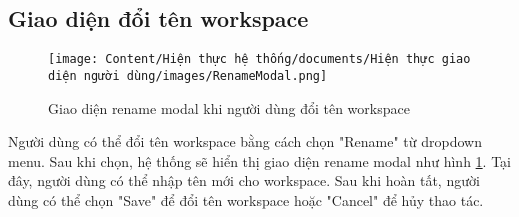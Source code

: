 \subsection{Giao diện đổi tên workspace}

\begin{figure}[H]
    \centering
    \texttt{[image: Content/Hiện thực hệ thống/documents/Hiện thực giao diện người dùng/images/RenameModal.png]}
    \vspace{0.5cm}
    \caption{Giao diện rename modal khi người dùng đổi tên workspace}
    \label{fig: Giao diện rename modal khi người dùng đổi tên workspace}
\end{figure}

Người dùng có thể đổi tên workspace bằng cách chọn "Rename" từ dropdown menu. Sau khi chọn, hệ thống sẽ hiển thị giao diện rename modal như hình \ref{fig: Giao diện rename modal khi người dùng đổi tên workspace}. Tại đây, người dùng có thể nhập tên mới cho workspace. Sau khi hoàn tất, người dùng có thể chọn "Save" để đổi tên workspace hoặc "Cancel" để hủy thao tác.